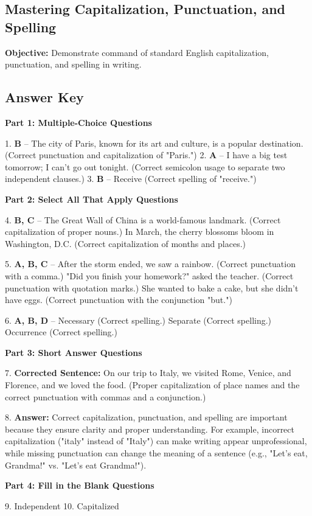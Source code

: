\documentclass[12pt]{article}
\begin{document}
\subsection*{Mastering Capitalization, Punctuation, and Spelling}
\onehalfspacing

\begin{tcolorbox}[colframe=black!40, colback=gray!0, title=Learning Objective]
\textbf{Objective:} Demonstrate command of standard English capitalization, punctuation, and spelling in writing.
\end{tcolorbox}


\subsection*{Answer Key}

\textbf{Part 1: Multiple-Choice Questions}

1. \textbf{B} – The city of Paris, known for its art and culture, is a popular destination. (Correct punctuation and capitalization of "Paris.")
2. \textbf{A} – I have a big test tomorrow; I can't go out tonight. (Correct semicolon usage to separate two independent clauses.)
3. \textbf{B} – Receive (Correct spelling of "receive.")

\textbf{Part 2: Select All That Apply Questions}

4. \textbf{B, C} – The Great Wall of China is a world-famous landmark. (Correct capitalization of proper nouns.)  
In March, the cherry blossoms bloom in Washington, D.C. (Correct capitalization of months and places.)

5. \textbf{A, B, C} – After the storm ended, we saw a rainbow. (Correct punctuation with a comma.)  
"Did you finish your homework?" asked the teacher. (Correct punctuation with quotation marks.)  
She wanted to bake a cake, but she didn't have eggs. (Correct punctuation with the conjunction "but.")

6. \textbf{A, B, D} – Necessary (Correct spelling.)  
Separate (Correct spelling.)  
Occurrence (Correct spelling.)

\textbf{Part 3: Short Answer Questions}

7. \textbf{Corrected Sentence:} On our trip to Italy, we visited Rome, Venice, and Florence, and we loved the food.  
(Proper capitalization of place names and the correct punctuation with commas and a conjunction.)

8. \textbf{Answer:} Correct capitalization, punctuation, and spelling are important because they ensure clarity and proper understanding. For example, incorrect capitalization ("italy" instead of "Italy") can make writing appear unprofessional, while missing punctuation can change the meaning of a sentence (e.g., "Let's eat, Grandma!" vs. "Let's eat Grandma!").

\textbf{Part 4: Fill in the Blank Questions}

9. Independent  
10. Capitalized  
\end{document}
